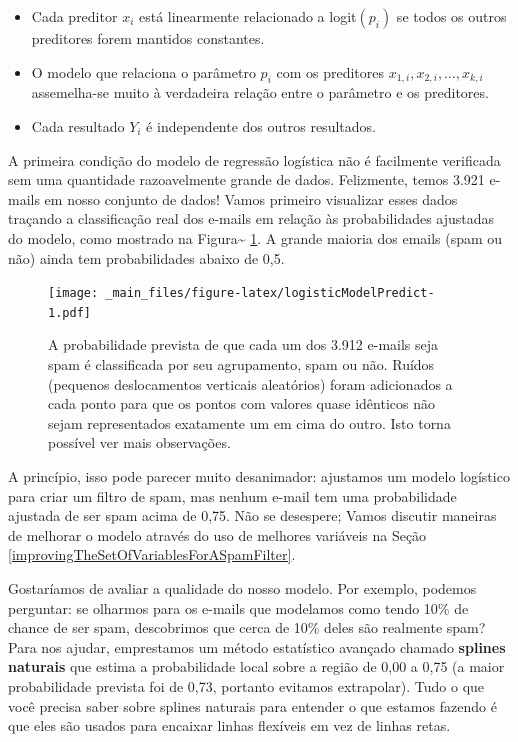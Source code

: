 \documentclass[
]{book}
\theoremstyle{definition}
\theoremstyle{definition}
\theoremstyle{definition}
\theoremstyle{definition}
\theoremstyle{remark}
\begin{document}
\begin{itemize}
\item
  Cada preditor \(x_i\) está linearmente relacionado a logit\((p_i)\) se todos os outros preditores forem mantidos constantes.
\item
  O modelo que relaciona o parâmetro \(p_i\) com os preditores \(x_{1,i}, x_{2,i}, \dots, x_{k,i}\) assemelha-se muito à verdadeira relação entre o parâmetro e os preditores.
\item
  Cada resultado \(Y_i\) é independente dos outros resultados.
\end{itemize}

A primeira condição do modelo de regressão logística não é facilmente verificada sem uma quantidade razoavelmente grande de dados. Felizmente, temos 3.921 e-mails em nosso conjunto de dados! Vamos primeiro visualizar esses dados traçando a classificação real dos e-mails em relação às probabilidades ajustadas do modelo, como mostrado na Figura\textasciitilde{} \ref{fig:logisticModelPredict}. A grande maioria dos emails (spam ou não) ainda tem probabilidades abaixo de 0,5.

\begin{figure}
\centering
\texttt{[image: \_main\_files/figure-latex/logisticModelPredict-1.pdf]}
\caption{\label{fig:logisticModelPredict}A probabilidade prevista de que cada um dos 3.912 e-mails seja spam é classificada por seu agrupamento, spam ou não. Ruídos (pequenos deslocamentos verticais aleatórios) foram adicionados a cada ponto para que os pontos com valores quase idênticos não sejam representados exatamente um em cima do outro. Isto torna possível ver mais observações.}
\end{figure}

A princípio, isso pode parecer muito desanimador: ajustamos um modelo logístico para criar um filtro de spam, mas nenhum e-mail tem uma probabilidade ajustada de ser spam acima de 0,75. Não se desespere; Vamos discutir maneiras de melhorar o modelo através do uso de melhores variáveis na Seção \ref{improvingTheSetOfVariablesForASpamFilter}.

Gostaríamos de avaliar a qualidade do nosso modelo. Por exemplo, podemos perguntar: se olharmos para os e-mails que modelamos como tendo 10\% de chance de ser spam, descobrimos que cerca de 10\% deles são realmente spam? Para nos ajudar, emprestamos um método estatístico avançado chamado \textbf{splines naturais} que estima a probabilidade local sobre a região de 0,00 a 0,75 (a maior probabilidade prevista foi de 0,73, portanto evitamos extrapolar). Tudo o que você precisa saber sobre splines naturais para entender o que estamos fazendo é que eles são usados para encaixar linhas flexíveis em vez de linhas retas.
\end{document}
